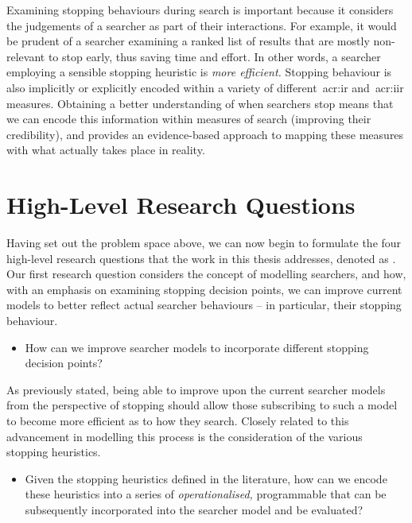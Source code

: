 Examining stopping behaviours during search is important because it considers the judgements of a searcher as part of their interactions. For example, it would be prudent of a searcher examining a ranked list of results that are mostly non-relevant to stop early, thus saving time and effort. In other words, a searcher employing a sensible stopping heuristic is \emph{more efficient.} Stopping behaviour is also implicitly or explicitly encoded within a variety of different~\gls{acr:ir} and~\gls{acr:iir} measures. Obtaining a better understanding of when searchers stop means that we can encode this information within measures of search (improving their credibility), and provides an evidence-based approach to mapping these measures with what actually takes place in reality.

\section{High-Level Research Questions}\label{sec:intro:rqs}
Having set out the problem space above, we can now begin to formulate the four high-level research questions that the work in this thesis addresses, denoted as . Our first research question considers the concept of modelling searchers, and how, with an emphasis on examining stopping decision points, we can improve current models to better reflect actual searcher behaviours -- in particular, their stopping behaviour.

\begin{itemize}
    \item{ How can we improve searcher models to incorporate different stopping decision points?}
\end{itemize}

As previously stated, being able to improve upon the current searcher models from the perspective of stopping should allow those subscribing to such a model to become more efficient as to how they search. Closely related to this advancement in modelling this process is the consideration of the various stopping heuristics.

\begin{itemize}
    \item{ Given the stopping heuristics defined in the literature, how can we encode these heuristics into a series of \emph{operationalised,} programmable  that can be subsequently incorporated into the searcher model and be evaluated?}
\end{itemize}

